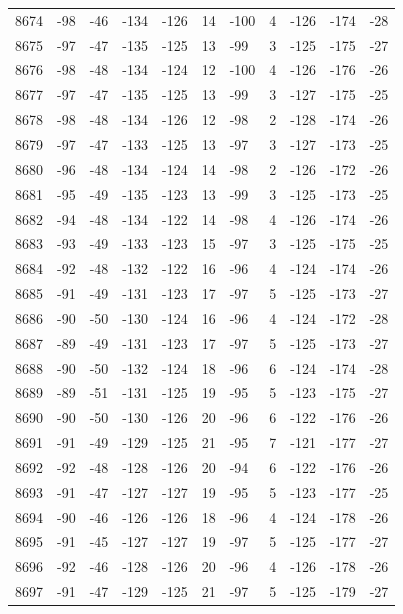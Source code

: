 \begin{table}[H]
\begin{tabular}{lllllllllll}
8674 & -98 & -46 & -134 & -126 & 14 & -100 & 4 & -126 & -174 & -28 \\
8675 & -97 & -47 & -135 & -125 & 13 & -99 & 3 & -125 & -175 & -27 \\
8676 & -98 & -48 & -134 & -124 & 12 & -100 & 4 & -126 & -176 & -26 \\
8677 & -97 & -47 & -135 & -125 & 13 & -99 & 3 & -127 & -175 & -25 \\
8678 & -98 & -48 & -134 & -126 & 12 & -98 & 2 & -128 & -174 & -26 \\
8679 & -97 & -47 & -133 & -125 & 13 & -97 & 3 & -127 & -173 & -25 \\
8680 & -96 & -48 & -134 & -124 & 14 & -98 & 2 & -126 & -172 & -26 \\
8681 & -95 & -49 & -135 & -123 & 13 & -99 & 3 & -125 & -173 & -25 \\
8682 & -94 & -48 & -134 & -122 & 14 & -98 & 4 & -126 & -174 & -26 \\
8683 & -93 & -49 & -133 & -123 & 15 & -97 & 3 & -125 & -175 & -25 \\
8684 & -92 & -48 & -132 & -122 & 16 & -96 & 4 & -124 & -174 & -26 \\
8685 & -91 & -49 & -131 & -123 & 17 & -97 & 5 & -125 & -173 & -27 \\
8686 & -90 & -50 & -130 & -124 & 16 & -96 & 4 & -124 & -172 & -28 \\
8687 & -89 & -49 & -131 & -123 & 17 & -97 & 5 & -125 & -173 & -27 \\
8688 & -90 & -50 & -132 & -124 & 18 & -96 & 6 & -124 & -174 & -28 \\
8689 & -89 & -51 & -131 & -125 & 19 & -95 & 5 & -123 & -175 & -27 \\
8690 & -90 & -50 & -130 & -126 & 20 & -96 & 6 & -122 & -176 & -26 \\
8691 & -91 & -49 & -129 & -125 & 21 & -95 & 7 & -121 & -177 & -27 \\
8692 & -92 & -48 & -128 & -126 & 20 & -94 & 6 & -122 & -176 & -26 \\
8693 & -91 & -47 & -127 & -127 & 19 & -95 & 5 & -123 & -177 & -25 \\
8694 & -90 & -46 & -126 & -126 & 18 & -96 & 4 & -124 & -178 & -26 \\
8695 & -91 & -45 & -127 & -127 & 19 & -97 & 5 & -125 & -177 & -27 \\
8696 & -92 & -46 & -128 & -126 & 20 & -96 & 4 & -126 & -178 & -26 \\
8697 & -91 & -47 & -129 & -125 & 21 & -97 & 5 & -125 & -179 & -27 \\

\end{tabular}
\end{table}
